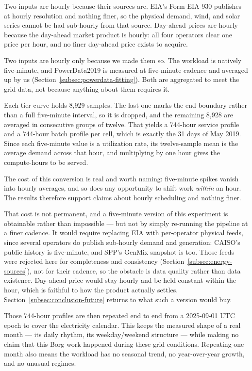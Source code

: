 ﻿\documentclass[12pt]{article}
\begin{document}
Two inputs are hourly because their sources are. EIA's Form EIA-930 publishes at
hourly resolution and nothing finer, so the physical demand, wind, and solar
series cannot be had sub-hourly from that source. Day-ahead prices are hourly
because the day-ahead market product is hourly: all four operators clear one
price per hour, and no finer day-ahead price exists to acquire.

Two inputs are hourly only because we made them so. The workload is natively
five-minute, and PowerData2019 is measured at five-minute cadence and averaged
up by us (Section~\ref{subsec:powerdata-fitting}). Both are aggregated to meet
the grid data, not because anything about them requires it.

Each tier curve holds 8,929 samples. The last one marks the end boundary rather
than a full five-minute interval, so it is dropped, and the remaining 8,928 are
averaged in consecutive groups of twelve. That yields a 744-hour service profile
and a 744-hour batch profile per cell, which is exactly the 31 days of May 2019.
Since each five-minute value is a utilization rate, its twelve-sample mean is
the average demand across that hour, and multiplying by one hour gives the
compute-hours to be served.

The cost of this conversion is real and worth naming: five-minute spikes vanish
into hourly averages, and so does any opportunity to shift work \emph{within} an
hour. The results therefore support claims about hourly scheduling and nothing
finer.

That cost is not permanent, and a five-minute version of this experiment is
obtainable rather than impossible --- but not by simply re-running the pipeline
at a finer cadence. It would require replacing EIA with per-operator physical
feeds, since several operators do publish sub-hourly demand and generation:
CAISO's public history is five-minute, and SPP's GenMix snapshot is too. Those
feeds were rejected here for completeness and consistency
(Section~\ref{subsec:energy-sources}), not for their cadence, so the obstacle is
data quality rather than data existence. Day-ahead price would stay hourly and
be held constant within the hour, which is faithful to how the product actually
settles. Section~\ref{subsec:conclusion-future} returns to what such a version
would buy.

Those 744-hour profiles are then repeated end to end from a
2025-09-01 UTC epoch to cover the electricity calendar. This keeps the measured
shape of a real month --- its daily rhythm, its weekday/weekend structure ---
while making no claim that this Borg work happened during these grid
conditions. Repeating one month also means the workload has no seasonal trend,
no year-over-year growth, and no unusual regimes.
\end{document}
